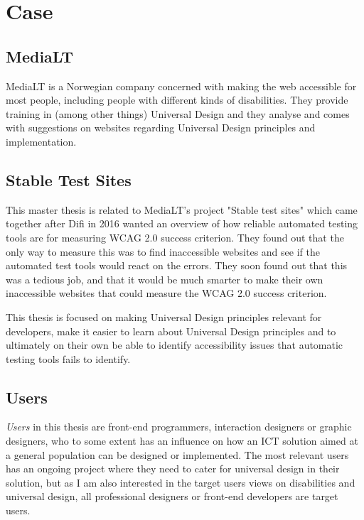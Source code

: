 \chapter{Case}
\section{MediaLT}
MediaLT is a Norwegian company concerned with making the web accessible for most people, including people with different kinds of disabilities. They provide training in (among other things) Universal Design and they analyse and comes with suggestions on websites regarding Universal Design principles and implementation.

\section{Stable Test Sites}
This master thesis is related to MediaLT's project "Stable test sites" which came together after Difi in 2016 wanted an overview of how reliable automated testing tools are for measuring WCAG 2.0 success criterion. They found out that the only way to measure this was to find inaccessible websites and see if the automated test tools would react on the errors. They soon found out that this was a tedious job, and that it would be much smarter to make their own inaccessible websites that could measure the WCAG 2.0 success criterion.

This thesis is focused on making Universal Design principles relevant for developers, make it easier to learn about Universal Design principles and to ultimately on their own be able to identify accessibility issues that automatic testing tools fails to identify.

\section{Users}
\textit{Users} in this thesis are front-end programmers, interaction designers or graphic designers, who to some extent has an influence on how an ICT solution aimed at a general population can be designed or implemented. The most relevant users has an ongoing project where they need to cater for universal design in their solution, but as I am also interested in the target users views on disabilities and universal design, all professional designers or front-end developers are target users. 

